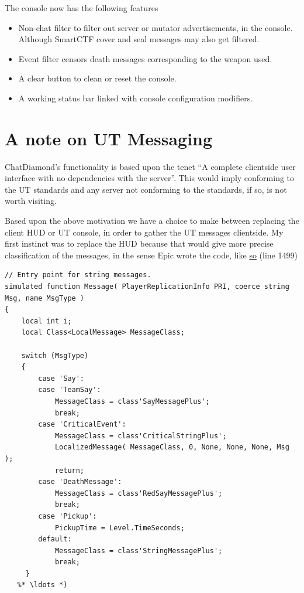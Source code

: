 \documentclass{article}
\begin{document}
The console now has the following features
\begin{itemize}
\item Non-chat filter to filter out server or mutator advertisements, in the console. Although SmartCTF cover and seal messages may also get filtered.
\item Event filter censors death messages corresponding to the weapon used.
\item A clear button to clean or reset the console.
\item A working status bar linked with console configuration modifiers.
\end{itemize}

\section{A note on UT Messaging}
ChatDiamond's functionality is based upon the tenet ``A complete clientside user interface with no dependencies with the server''.  This would imply conforming to the UT standards and any server not conforming to the standards, if so, is not worth visiting.

Based upon the above motivation we have a choice to make between replacing the client HUD or UT console, in order to gather the UT messages clientside.  My first instinct was to replace the HUD because that would give more precise classification of the messages, in the sense Epic wrote the code, like \href{http://uncodex.ut-files.com/UT/v436/Source_botpack/challengehud.html}{so} (line 1499)

\begin{lstlisting}[frame=single]
// Entry point for string messages.
simulated function Message( PlayerReplicationInfo PRI, coerce string Msg, name MsgType )
{
    local int i;
    local Class<LocalMessage> MessageClass;

    switch (MsgType)
    {
        case 'Say':
        case 'TeamSay':
            MessageClass = class'SayMessagePlus';
            break;
        case 'CriticalEvent':
            MessageClass = class'CriticalStringPlus';
            LocalizedMessage( MessageClass, 0, None, None, None, Msg );
            return;
        case 'DeathMessage':
            MessageClass = class'RedSayMessagePlus';
            break;
        case 'Pickup':
            PickupTime = Level.TimeSeconds;
        default:
            MessageClass = class'StringMessagePlus';
            break;
     }
   %* \ldots *)           
\end{lstlisting}
\end{document}
